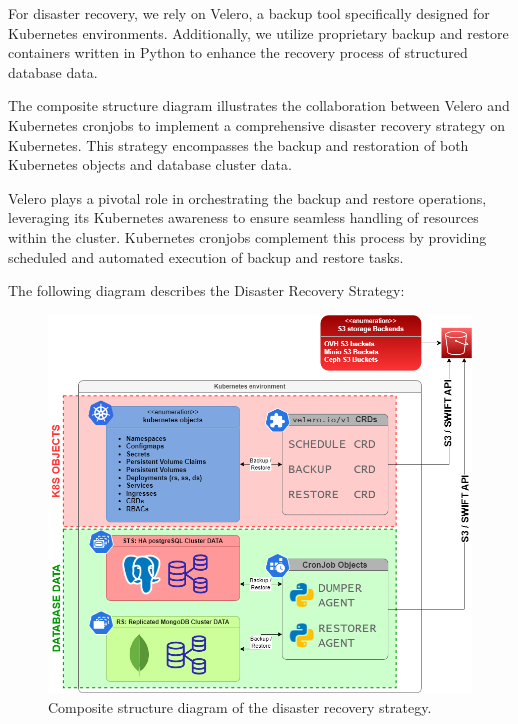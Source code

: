 \hspace{7mm}For disaster recovery, we rely on Velero, a backup tool specifically designed for Kubernetes environments. Additionally, we utilize proprietary backup and restore containers written in Python to enhance the recovery process of structured database data.

\hspace{7mm}The composite structure diagram illustrates the collaboration between Velero and Kubernetes cronjobs to implement a comprehensive disaster recovery strategy on Kubernetes. This strategy encompasses the backup and restoration of both Kubernetes objects and database cluster data.

\hspace{7mm}Velero plays a pivotal role in orchestrating the backup and restore operations, leveraging its Kubernetes awareness to ensure seamless handling of resources within the cluster. Kubernetes cronjobs complement this process by providing scheduled and automated execution of backup and restore tasks.

\hspace{7mm}The following diagram describes the Disaster Recovery Strategy: 

\begin{figure}[H]\centering
    \includegraphics[width=1.0\textwidth,angle=00]{assets/f56.png}
    \caption{Composite structure diagram of the disaster recovery strategy.}
    \label{fig:f56}
\end{figure}
\newpage
